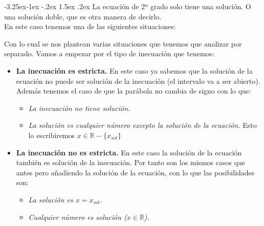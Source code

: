 \documentclass[a4paper,11pt,answers]{exam}
\makeatletter
\newcommand{\realset}{\mathbb{R}}
\renewcommand\paragraph{\@startsection{paragraph}{4}{\z@}%
                                     {-3.25ex\@plus -1ex \@minus -.2ex}%
                                     {1.5ex \@plus .2ex}%
                                     {\normalfont\normalsize\bfseries}}
\makeatother
\begin{document}
\paragraph{La ecuación de 2º grado solo tiene una solución.}
O una solución doble, que es otra manera de decirlo.\\

En este caso tenemos una de las siguientes situaciones:
\begin{center}
  \quad\quad\quad
\end{center}

Con lo cual se nos plantean varias situaciones que tenemos que analizar por separado. Vamos a
empezar por el tipo de inecuación que tenemos:
\begin{itemize}
\item \textbf{La inecuación es estricta.} En este caso ya sabemos que la solución de la
  ecuación no puede ser solución de la inecuación (el intervalo va a ser abierto).\\
  Además tenemos el caso de que la parábola no cambia de signo con lo que:
  \begin{itemize}
  \item \emph{La inecuación no tiene solución.}
  \item \emph{La solución es cualquier número excepto la solución de la ecuación.} Esto lo
    escribiremos $ x \in \realset - \lbrace x_{sol}\rbrace$
  \end{itemize}
\item \textbf{La inecuación no es estricta.} En este caso la solución de la ecuación también
  es solución de la inecuación. Por tanto son los mismos casos que antes pero añadiendo la solución
  de la ecuación, con lo que las posibilidades son:
  \begin{itemize}
  \item \emph{La solución es $x= x_{sol}$.}
  \item \emph{Cualquier número es solución ($x \in \realset$).}
  \end{itemize}
\end{itemize}
\end{document}
